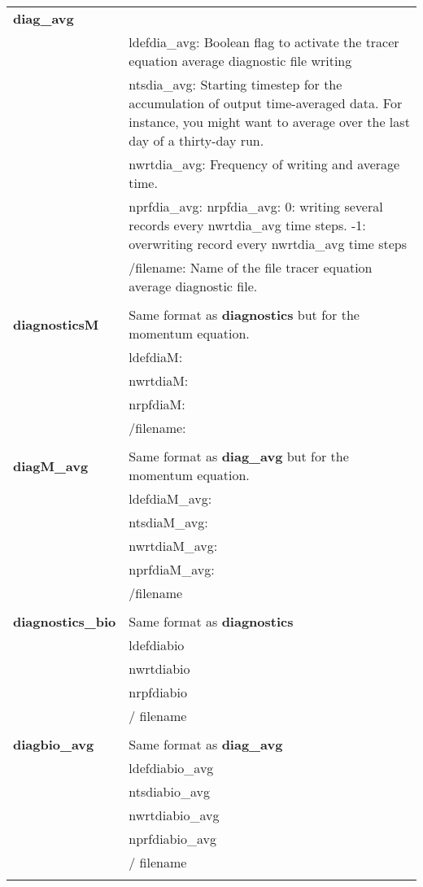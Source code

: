 \begin{longtable}{|p{0.25\linewidth}|p{0.75\linewidth}|}
\large{\textbf{diag\_avg}} &     \\
&ldefdia\_avg: Boolean flag to activate the tracer equation average diagnostic file writing  \\
&ntsdia\_avg: Starting timestep for the accumulation of output time-averaged data. For
instance, you might want to average over the last day of a thirty-day run.  \\
&nwrtdia\_avg: Frequency of writing and average time.   \\
&nprfdia\_avg: nrpfdia\_avg: 0: writing several records every nwrtdia\_avg time steps. -1: overwriting record
every nwrtdia\_avg time steps \\
&/filename: Name of the file tracer equation average diagnostic file. \\
&  \\ 

\large{\textbf{diagnosticsM}} &   Same format as \large{\textbf{diagnostics}} but for the momentum equation. \\
&ldefdiaM:     \\
&nwrtdiaM:     \\
&nrpfdiaM:     \\
&/filename:    \\
 &  \\ 

\large{\textbf{diagM\_avg}} &  Same format as \large{\textbf{diag\_avg}} but for the momentum equation. \\
&ldefdiaM\_avg:     \\
&ntsdiaM\_avg:      \\
&nwrtdiaM\_avg:     \\
&nprfdiaM\_avg:     \\
&/filename          \\
&  \\ 

\large{\textbf{diagnostics\_bio}} & Same format as \large{\textbf{diagnostics}}     \\
&ldefdiabio   \\
&nwrtdiabio   \\
&nrpfdiabio   \\
&/ filename    \\
&  \\ 

\large{\textbf{diagbio\_avg}} & Same format as \large{\textbf{diag\_avg}}  \\
&ldefdiabio\_avg  \\
&ntsdiabio\_avg   \\
&nwrtdiabio\_avg  \\
&nprfdiabio\_avg  \\
&/ filename \\
&  \\ 


\end{longtable}

